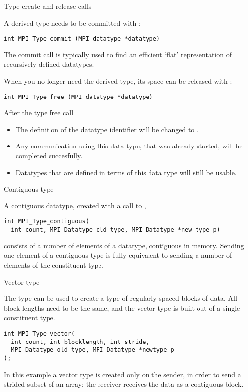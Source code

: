  {Type create and release calls}

A derived type needs to be committed with :
\begin{verbatim}
int MPI_Type_commit (MPI_datatype *datatype)
\end{verbatim}
The commit call is typically used to find an efficient `flat' representation
of recursively defined datatypes.

When you no longer need the derived type, its space can be released with
:
\begin{verbatim}
int MPI_Type_free (MPI_datatype *datatype)
\end{verbatim}
After the type free call
\begin{itemize}
\item The definition of the datatype identifier will be changed to
  .
\item Any communication using this data type, that was already
  started, will be completed succesfully.
\item Datatypes that are defined in terms of this data type will still
  be usable.
\end{itemize}

 {Contiguous type}

A contiguous datatype, created with a call to ,
\begin{verbatim}
int MPI_Type_contiguous(
  int count, MPI_Datatype old_type, MPI_Datatype *new_type_p)
\end{verbatim}
consists of a number of elements of a datatype, contiguous in memory.
Sending one element of a contiguous type is fully equivalent to sending
a number of elements of the constituent type.

 {Vector type}

The  type can be used to create a type
of regularly spaced blocks of data. All block lengths need to be the same,
and the vector type is built out of a single constituent type.
\begin{verbatim}
int MPI_Type_vector(
  int count, int blocklength, int stride,
  MPI_Datatype old_type, MPI_Datatype *newtype_p
);
\end{verbatim}

In this example a vector type is created only on the sender, in order to send
a strided subset of an array; the receiver receives the data as a contiguous block.

